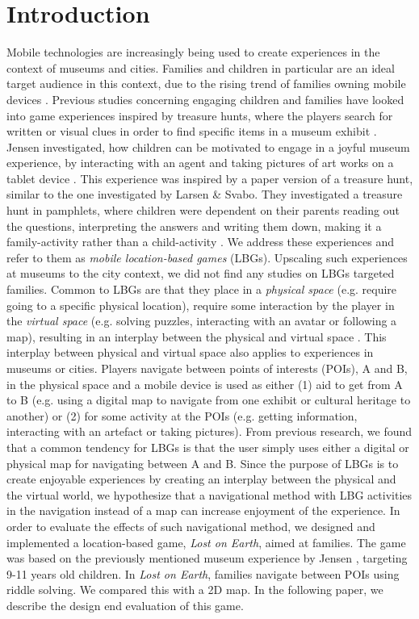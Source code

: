 \section{Introduction}
Mobile technologies are increasingly being used to create experiences in the context of museums and cities. Families and children in particular are an ideal target audience in this context, due to the rising trend of families owning mobile devices \cite{Statistik}. Previous studies concerning engaging children and families have looked into game experiences inspired by treasure hunts, where the players search for written or visual clues in order to find specific items in a museum exhibit \cite{Lynge} \cite{larsen2014tourist}. Jensen investigated, how children can be motivated to engage in a joyful museum experience, by interacting with an agent and taking pictures of art works on a tablet device \cite{Lynge}. This experience was inspired by a paper version of a treasure hunt, similar to the one investigated by Larsen \& Svabo. They investigated a treasure hunt in pamphlets, where children were dependent on their parents reading out the questions, interpreting the answers and writing them down, making it a family-activity rather than a child-activity \cite{larsen2014tourist}. We address these experiences and refer to them as \textit{mobile location-based games} (LBGs). Upscaling such experiences at museums to the city context, we did not find any studies on LBGs targeted families. Common to LBGs are that they place in a \textit{physical space} (e.g. require going to a specific physical location), require some interaction by the player in the \textit{virtual space} (e.g. solving puzzles, interacting with an avatar or following a map), resulting in an interplay between the physical and virtual space \cite{LBG_Review}. This interplay between physical and virtual space also applies to experiences in museums or cities. Players navigate between points of interests (POIs), A and B, in the physical space and a mobile device is used as either (1) aid to get from A to B (e.g. using a digital map to navigate from one exhibit or cultural heritage to another) or (2) for some activity at the POIs (e.g. getting information, interacting with an artefact or taking pictures). From previous research, we found that a common tendency for LBGs is that the user simply uses either a digital or physical map for navigating between A and B. Since the purpose of LBGs is to create enjoyable experiences by creating an interplay between the physical and the virtual world, we hypothesize that a navigational method with LBG activities in the navigation instead of a map can increase enjoyment of the experience. In order to evaluate the effects of such navigational method, we designed and implemented a location-based game, \textit{Lost on Earth}, aimed at families. The game was based on the previously mentioned museum experience by Jensen \cite{Lynge}, targeting 9-11 years old children. In \textit{Lost on Earth}, families navigate between POIs using riddle solving. We compared this with a 2D map. In the following paper, we describe the design end evaluation of this game. 

